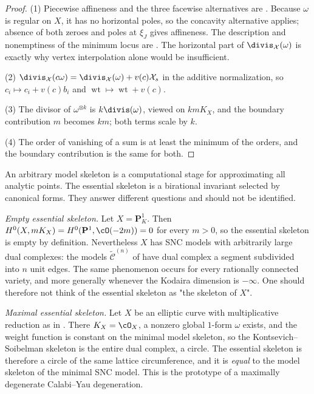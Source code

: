 \begin{proof}
(1) Piecewise affineness and the three facewise alternatives are
\cite[Proposition~4.4.3]{MustataNicaise2015}.  Because $\omega$ is regular
on $X$, it has no horizontal poles, so the concavity alternative applies;
absence of both zeroes and poles at $\xi_J$ gives affineness.  The
description and nonemptiness of the minimum locus are
\cite[Theorem~4.7.5]{MustataNicaise2015}.  The horizontal part of
$\divis_{\mathcal X}(\omega)$ is exactly why vertex interpolation alone
would be insufficient.

(2) $\divis_{\mathcal X}(c\omega)=\divis_{\mathcal X}(\omega)+v(c)
\mathcal X_s$ in the additive normalization, so
$c_i\mapsto c_i+v(c)b_i$ and $\operatorname{wt}\mapsto
\operatorname{wt}+v(c)$.

(3) The divisor of $\omega^{\otimes k}$ is $k\divis(\omega)$, viewed on
$kmK_X$, and the boundary contribution $m$ becomes $km$; both terms
scale by $k$.

(4) The order of vanishing of a sum is at least the minimum of the orders,
and the boundary contribution is the same for both.
\end{proof}

\begin{remark}
\label{rem:skeleton-model-vs-essential}
An arbitrary model skeleton is a computational stage for approximating all
analytic points. The essential skeleton is a birational invariant selected
by canonical forms. They answer different questions and should not be
identified.
\end{remark}

\begin{example}
\label{ex:essential-extremes}
\emph{Empty essential skeleton.} Let $X=\mathbf P^1_K$. Then
$H^0(X,mK_X)=H^0(\mathbf P^1,\cO(-2m))=0$ for every $m>0$, so the
essential skeleton is empty by definition. Nevertheless $X$ has SNC models
with arbitrarily large dual complexes: the models
$\widetilde{\mathcal C}^{(n)}$ of  have dual
complex a segment subdivided into $n$ unit edges. The same phenomenon
occurs for every rationally connected variety, and more generally whenever
the Kodaira dimension is $-\infty$. One should therefore not think of the
essential skeleton as "the skeleton of $X$".

\emph{Maximal essential skeleton.} Let $X$ be an elliptic curve with
multiplicative reduction as in . There
$K_X=\cO_X$, a nonzero global $1$-form $\omega$ exists, and the
weight function is constant on the minimal model skeleton, so the Kontsevich--Soibelman
skeleton is the entire dual complex, a circle. The essential skeleton is
therefore a circle of the same lattice circumference, and it is
\emph{equal} to the model skeleton of the minimal SNC model. This is the
prototype of a maximally degenerate Calabi--Yau degeneration.
\end{example}

